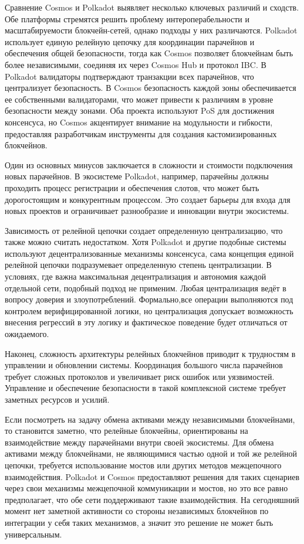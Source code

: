 Сравнение Cosmos и Polkadot выявляет несколько ключевых различий и сходств. Обе платформы стремятся решить проблему интероперабельности и масштабируемости блокчейн-сетей, однако подходы у них различаются. Polkadot использует единую релейную цепочку для координации парачейнов и обеспечения общей безопасности, тогда как Cosmos позволяет блокчейнам быть более независимыми, соединяя их через Cosmos Hub и протокол IBC. В Polkadot валидаторы подтверждают транзакции всех парачейнов, что централизует безопасность. В Cosmos безопасность каждой зоны обеспечивается ее собственными валидаторами, что может привести к различиям в уровне безопасности между зонами. Оба проекта используют PoS для достижения консенсуса, но Cosmos акцентирует внимание на модульности и гибкости, предоставляя разработчикам инструменты для создания кастомизированных блокчейнов.

Один из основных минусов заключается в сложности и стоимости подключения новых парачейнов. В экосистеме Polkadot, например, парачейны должны проходить процесс регистрации и обеспечения слотов, что может быть дорогостоящим и конкурентным процессом. Это создает барьеры для входа для новых проектов и ограничивает разнообразие и инновации внутри экосистемы.

Зависимость от релейной цепочки создает определенную централизацию, что также можно считать недостатком. Хотя Polkadot и другие подобные системы используют децентрализованные механизмы консенсуса, сама концепция единой релейной цепочки подразумевает определенную степень централизации. В условиях, где важна максимальная децентрализация и автономия каждой отдельной сети, подобный подход не применим. Любая централизация ведёт в вопросу доверия и злоупотреблений. Формально,все операции выполняются под контролем верифицированной логики, но централизация допускает возможность внесения регрессий в эту логику и фактическое поведение будет отличаться от ожидаемого.

Наконец, сложность архитектуры релейных блокчейнов приводит к трудностям в управлении и обновлении системы. Координация большого числа парачейнов требует сложных протоколов и увеличивает риск ошибок или уязвимостей. Управление и обеспечение безопасности в такой комплексной системе требует заметных ресурсов и усилий.

Если посмотреть на задачу обмена активами между независимыми блокчейнами, то становится заметно, что релейные блокчейны, ориентированы на взаимодействие между парачейнами внутри своей экосистемы. Для обмена активами между блокчейнами, не являющимися частью одной и той же релейной цепочки, требуется использование мостов или других методов межцепочного взаимодействия. Polkadot и Cosmos предоставляют решения для таких сценариев через свои механизмы межцепочной коммуникации и мостов, но это все равно предполагает, что обе сети поддерживают такие взаимодействия. На сегодняшний момент нет заметной активности со стороны независимых блокчейнов по интеграции у себя таких механизмов, а значит это решение не может быть универсальным.

